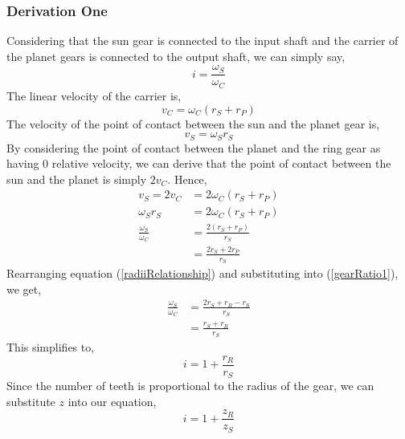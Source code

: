 \documentclass[12pt]{article}
\numberwithin{equation}{section}
\begin{document}
\begin{flushleft}
\subsubsection{Derivation One}
Considering that the sun gear is connected to the input shaft and the carrier of the planet gears is connected to the output shaft, we can simply say,
\begin{equation}
  i = \frac{\omega_S}{\omega_C}
\end{equation}
The linear velocity of the carrier is,
\begin{equation}
  v_C = \omega_C (r_S + r_P)
\end{equation}
The velocity of the point of contact between the sun and the planet gear is,
\begin{equation}
  v_S = \omega_S r_S
\end{equation}
By considering the point of contact between the planet and the ring gear as having 0 relative velocity, we can derive that the point of contact between the sun and the planet is simply $2v_C$. Hence,
\begin{align}
  v_S = 2v_C &= 2\omega_C(r_S + r_P)\\
  \omega_S r_S &= 2\omega_C (r_S + r_P)\\
  \frac{\omega_S}{\omega_C} &= \frac{2(r_S + r_P)}{r_S}\\
  &= \frac{2r_S + 2r_P}{r_S} \label{gearRatio1}
\end{align}
Rearranging equation (\ref{radiiRelationship}) and substituting into (\ref{gearRatio1}), we get,
\begin{align}
  \frac{\omega_S}{\omega_C} &= \frac{2r_S + r_R - r_S}{r_S}\\
  &= \frac{r_S + r_R}{r_S}
\end{align}
This simplifies to,
\begin{equation}
  i = 1 + \frac{r_R}{r_S}
\end{equation}
Since the number of teeth is proportional to the radius of the gear, we can substitute $z$ into our equation,
\begin{equation}
  i = 1 + \frac{z_R}{z_S}
\end{equation}

\end{flushleft}
\end{document}
